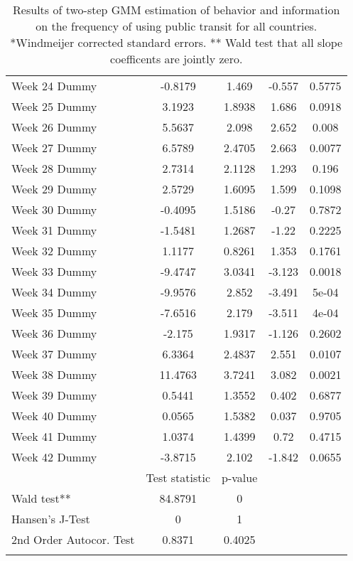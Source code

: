 \begin{longtable}{lcccc}
  Week 24 Dummy & -0.8179 & 1.469 & -0.557 & 0.5775 \\ 
  Week 25 Dummy & 3.1923 & 1.8938 & 1.686 & 0.0918 \\ 
  Week 26 Dummy & 5.5637 & 2.098 & 2.652 & 0.008 \\ 
  Week 27 Dummy & 6.5789 & 2.4705 & 2.663 & 0.0077 \\ 
  Week 28 Dummy & 2.7314 & 2.1128 & 1.293 & 0.196 \\ 
  Week 29 Dummy & 2.5729 & 1.6095 & 1.599 & 0.1098 \\ 
  Week 30 Dummy & -0.4095 & 1.5186 & -0.27 & 0.7872 \\ 
  Week 31 Dummy & -1.5481 & 1.2687 & -1.22 & 0.2225 \\ 
  Week 32 Dummy & 1.1177 & 0.8261 & 1.353 & 0.1761 \\ 
  Week 33 Dummy & -9.4747 & 3.0341 & -3.123 & 0.0018 \\ 
  Week 34 Dummy & -9.9576 & 2.852 & -3.491 & 5e-04 \\ 
  Week 35 Dummy & -7.6516 & 2.179 & -3.511 & 4e-04 \\ 
  Week 36 Dummy & -2.175 & 1.9317 & -1.126 & 0.2602 \\ 
  Week 37 Dummy & 6.3364 & 2.4837 & 2.551 & 0.0107 \\ 
  Week 38 Dummy & 11.4763 & 3.7241 & 3.082 & 0.0021 \\ 
  Week 39 Dummy & 0.5441 & 1.3552 & 0.402 & 0.6877 \\ 
  Week 40 Dummy & 0.0565 & 1.5382 & 0.037 & 0.9705 \\ 
  Week 41 Dummy & 1.0374 & 1.4399 & 0.72 & 0.4715 \\ 
  Week 42 Dummy & -3.8715 & 2.102 & -1.842 & 0.0655 \\ 
   & Test statistic & p-value &  &  \\ 
  Wald test** & 84.8791 & 0 &  &  \\ 
  Hansen's J-Test & 0 & 1 &  &  \\ 
  2nd Order Autocor. Test & 0.8371 & 0.4025 &  &  \\ 
   \bottomrule
\caption{Results of two-step GMM estimation of behavior and information on the frequency of using public transit for all countries. *Windmeijer corrected standard errors. ** Wald test that all slope coefficents are jointly zero.} 
\label{tab_results:transit_full}
\end{longtable}
\endgroup
